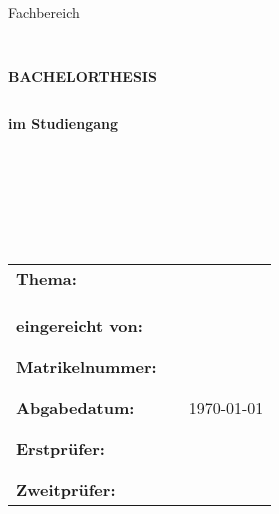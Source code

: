 \begin{titlepage}
	\begin{center}
		\myUni\\
	\end{center}
	\begin{center}
		\large Fachbereich \myDepartment
	\end{center}
	\begin{verbatim}


	\end{verbatim}
	\begin{center}
		\uppercase{\textbf{\large Bachelorthesis}}
	\end{center}
	\begin{verbatim}
	\end{verbatim}
	\begin{center}
		\textbf{im Studiengang \myMajor}
	\end{center}
	\begin{verbatim}







	\end{verbatim}
	\begin{flushleft}
		\begin{tabular}{lll}
			\textbf{Thema:} & & \myTitle \\
			& & \\
			& & \\
			& & \\
			\textbf{eingereicht von:} & & \myName\ \myEMail\\
			& & \\
			& & \\
			\textbf{Matrikelnummer:} & & \myMatricleNumber\\
			& & \\
			& & \\
			\textbf{Abgabedatum:} & & \today\\
			& & \\
			& & \\
			\textbf{Erstprüfer:} & & \myProf\\
			& & \\
			& & \\
			\textbf{Zweitprüfer:} & & \myOtherProf
		\end{tabular}
	\end{flushleft}
\end{titlepage}
